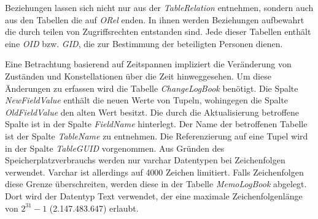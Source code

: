 Beziehungen lassen sich nicht nur aus der \textit{TableRelation} entnehmen, sondern auch aus den Tabellen die auf \textit{ORel} enden. In ihnen werden  Beziehungen aufbewahrt die durch teilen von Zugriffsrechten entstanden sind. Jede dieser Tabellen enthält eine \textit{OID} bzw. \textit{GID}, die zur Bestimmung der beteiligten Personen dienen.

Eine Betrachtung basierend auf Zeitspannen impliziert die Veränderung von Zuständen und Konstellationen über die Zeit hinweggesehen. Um diese Änderungen zu erfassen wird die Tabelle \textit{ChangeLogBook} benötigt. Die Spalte \textit{NewFieldValue} enthält die neuen Werte von Tupeln, wohingegen die Spalte \textit{OldFieldValue} den alten Wert besitzt. Die durch die Aktualisierung betroffene Spalte ist in der Spalte \textit{FieldName} hinterlegt. Der Name der betroffenen Tabelle ist der Spalte \textit{TableName} zu entnehmen. Die Referenzierung auf eine Tupel wird in der Spalte \textit{TableGUID} vorgenommen. Aus Gründen des Speicherplatzverbrauchs werden nur varchar Datentypen bei Zeichenfolgen verwendet. Varchar ist allerdings auf 4000 Zeichen limitiert. Falls Zeichenfolgen diese Grenze überschreiten, werden diese in der Tabelle \textit{MemoLogBook} abgelegt. Dort wird der Datentyp Text verwendet, der eine maximale Zeichenfolgenlänge von $2^{31}-1$ (2.147.483.647) erlaubt.